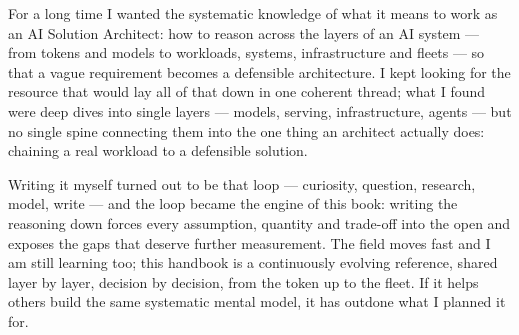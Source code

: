 
\renewcommand{\thefigure}{P.\arabic{figure}}

For a long time I wanted the systematic knowledge of what it means to work
as an AI Solution Architect: how to reason across the layers of an AI system
--- from tokens and models to workloads, systems, infrastructure and fleets
--- so that a vague requirement becomes a defensible architecture. I kept
looking for the resource that would lay all of that down in one coherent
thread; what I found were deep dives into single layers --- models, serving,
infrastructure, agents --- but no single spine connecting them into the one
thing an architect actually does: chaining a real workload to a defensible
solution.

Writing it myself turned out to be that loop --- curiosity, question,
research, model, write --- and the loop became the engine of this book:
writing the reasoning down forces every assumption,
quantity and trade-off into the open and exposes the gaps that deserve
further measurement. The field moves fast and I am still learning too; this
handbook is a continuously evolving reference, shared layer by layer,
decision by decision, from the token up to the fleet. If it helps others
build the same systematic mental model, it has outdone what I planned it for.

\noindent{}

